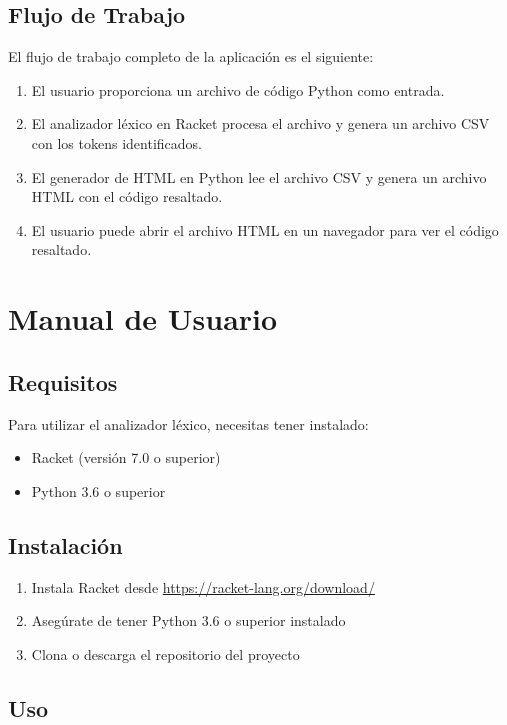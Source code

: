 \documentclass[12pt,letterpaper]{report}
\begin{document}
\section{Flujo de Trabajo}

El flujo de trabajo completo de la aplicación es el siguiente:

\begin{enumerate}
    \item El usuario proporciona un archivo de código Python como entrada.
    \item El analizador léxico en Racket procesa el archivo y genera un archivo CSV con los tokens identificados.
    \item El generador de HTML en Python lee el archivo CSV y genera un archivo HTML con el código resaltado.
    \item El usuario puede abrir el archivo HTML en un navegador para ver el código resaltado.
\end{enumerate}

\chapter{Manual de Usuario}

\section{Requisitos}

Para utilizar el analizador léxico, necesitas tener instalado:

\begin{itemize}
    \item Racket (versión 7.0 o superior)
    \item Python 3.6 o superior
\end{itemize}

\section{Instalación}

\begin{enumerate}
    \item Instala Racket desde \url{https://racket-lang.org/download/}
    \item Asegúrate de tener Python 3.6 o superior instalado
    \item Clona o descarga el repositorio del proyecto
\end{enumerate}

\section{Uso}
\end{document}
